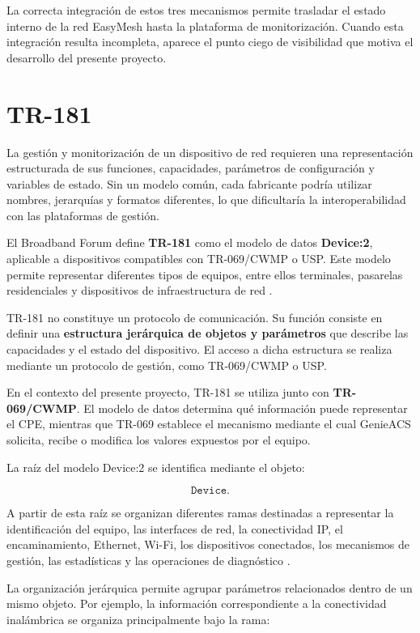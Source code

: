 La correcta integración de estos tres mecanismos permite trasladar el
estado interno de la red EasyMesh hasta la plataforma de monitorización.
Cuando esta integración resulta incompleta, aparece el punto ciego de
visibilidad que motiva el desarrollo del presente proyecto.

\section{TR-181}
\label{sec:tr-181}

La gestión y monitorización de un dispositivo de red requieren una
representación estructurada de sus funciones, capacidades, parámetros de
configuración y variables de estado. Sin un modelo común, cada fabricante
podría utilizar nombres, jerarquías y formatos diferentes, lo que
dificultaría la interoperabilidad con las plataformas de gestión.

El Broadband Forum define \textbf{TR-181} como el modelo de datos
\textbf{Device:2}, aplicable a dispositivos compatibles con TR-069/CWMP
o USP. Este modelo permite representar diferentes tipos de equipos,
entre ellos terminales, pasarelas residenciales y dispositivos de
infraestructura de red \cite{bbf_tr181}.

TR-181 no constituye un protocolo de comunicación. Su función consiste
en definir una \textbf{estructura jerárquica de objetos y parámetros}
que describe las capacidades y el estado del dispositivo. El acceso a
dicha estructura se realiza mediante un protocolo de gestión, como
TR-069/CWMP o USP.

En el contexto del presente proyecto, TR-181 se utiliza junto con
\textbf{TR-069/CWMP}. El modelo de datos determina qué información puede
representar el CPE, mientras que TR-069 establece el mecanismo mediante
el cual GenieACS solicita, recibe o modifica los valores expuestos por el
equipo.

La raíz del modelo Device:2 se identifica mediante el objeto:

\[
    \texttt{Device.}
\]

A partir de esta raíz se organizan diferentes ramas destinadas a
representar la identificación del equipo, las interfaces de red, la
conectividad IP, el encaminamiento, Ethernet, Wi-Fi, los dispositivos
conectados, los mecanismos de gestión, las estadísticas y las
operaciones de diagnóstico \cite{bbf_tr181}.

La organización jerárquica permite agrupar parámetros relacionados dentro
de un mismo objeto. Por ejemplo, la información correspondiente a la
conectividad inalámbrica se organiza principalmente bajo la rama:

